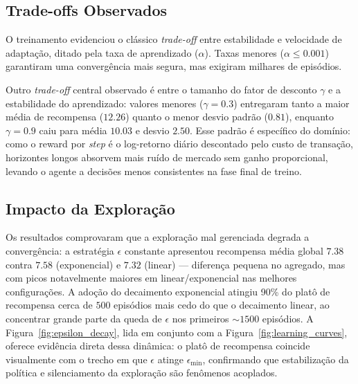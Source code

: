 \documentclass{article}
\begin{document}
\subsection{Trade-offs Observados}
O treinamento evidenciou o clássico \textit{trade-off} entre estabilidade e velocidade de adaptação, ditado pela taxa de aprendizado ($\alpha$). Taxas menores ($\alpha \le 0.001$) garantiram uma convergência mais segura, mas exigiram milhares de episódios.

Outro \textit{trade-off} central observado é entre o tamanho do fator de desconto $\gamma$ e a estabilidade do aprendizado: valores menores ($\gamma=0.3$) entregaram tanto a maior média de recompensa ($12.26$) quanto o menor desvio padrão ($0.81$), enquanto $\gamma=0.9$ caiu para média $10.03$ e desvio $2.50$. Esse padrão é específico do domínio: como o reward por \textit{step} é o log-retorno diário descontado pelo custo de transação, horizontes longos absorvem mais ruído de mercado sem ganho proporcional, levando o agente a decisões menos consistentes na fase final de treino.

\subsection{Impacto da Exploração}
Os resultados comprovaram que a exploração mal gerenciada degrada a convergência: a estratégia $\epsilon$ constante apresentou recompensa média global $7.38$ contra $7.58$ (exponencial) e $7.32$ (linear) — diferença pequena no agregado, mas com picos notavelmente maiores em linear/exponencial nas melhores configurações. A adoção do decaimento exponencial atingiu 90\% do platô de recompensa cerca de $500$ episódios mais cedo do que o decaimento linear, ao concentrar grande parte da queda de $\epsilon$ nos primeiros $\sim$$1500$ episódios. A Figura~\ref{fig:epsilon_decay}, lida em conjunto com a Figura~\ref{fig:learning_curves}, oferece evidência direta dessa dinâmica: o platô de recompensa coincide visualmente com o trecho em que $\epsilon$ atinge $\epsilon_{\min}$, confirmando que estabilização da política e silenciamento da exploração são fenômenos acoplados.
\end{document}
